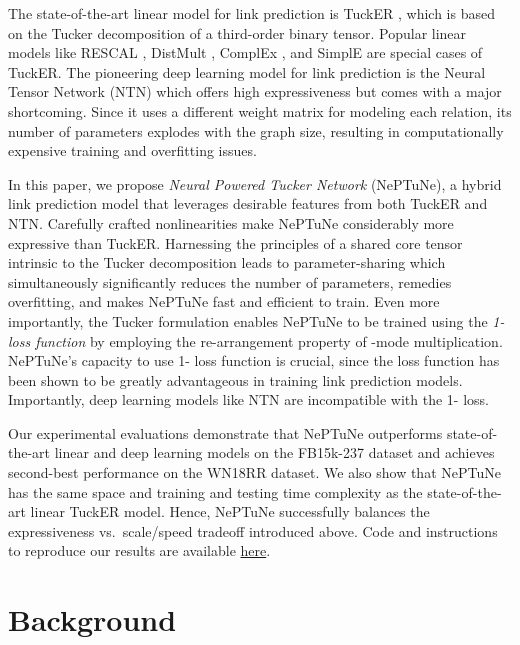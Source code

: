 \documentclass[11pt]{article}
\begin{document}
The state-of-the-art linear model for link prediction is TuckER \cite{balavzevic2019tucker}, which is based on the Tucker decomposition \cite{tucker1966some,tucker1964extension} of a third-order binary tensor. 
Popular linear models like RESCAL \cite{nickel2011three}, DistMult \cite{yang2014embedding}, ComplEx \cite{trouillon2016complex}, and SimplE \cite{poole2018simple} are special cases of TuckER. 
The pioneering deep learning model for link prediction is the Neural Tensor Network (NTN) \cite{socher2013reasoning} which offers high expressiveness but comes with a major shortcoming.
Since it uses a different weight matrix for modeling each relation, its number of parameters explodes with the graph size, resulting in computationally expensive training and overfitting issues.



In this paper, we propose \textit{Neural Powered Tucker Network} (NePTuNe), a hybrid link prediction model that leverages desirable features from both TuckER and NTN. 
Carefully crafted nonlinearities make NePTuNe considerably more expressive than TuckER. 
Harnessing the principles of a shared core tensor intrinsic to the Tucker decomposition leads to parameter-sharing which simultaneously significantly reduces the number of parameters, remedies overfitting, and makes NePTuNe fast and efficient to train.
Even more importantly, the Tucker formulation enables NePTuNe to be trained using the {\em 1- loss function} by employing the re-arrangement property of -mode multiplication. 
NePTuNe's capacity to use 1- loss function is crucial, since the loss function has been shown to be greatly advantageous in training link prediction models.
Importantly, deep learning models like NTN are incompatible with the 1- loss.

Our experimental evaluations demonstrate that NePTuNe outperforms state-of-the-art linear and deep learning models on the FB15k-237 dataset \cite{toutanova2015representing} and achieves second-best performance on the WN18RR \cite{dettmers2018convolutional} dataset. 
We also show that NePTuNe has the same space and training and testing time complexity as the state-of-the-art linear TuckER model. 
Hence, NePTuNe successfully balances the expressiveness vs.\ scale/speed tradeoff introduced above.
Code and instructions to reproduce our results are available \textcolor{blue}{\href{https://github.com/luffycodes/neptune}{here}}.

\section{Background}
\end{document}
